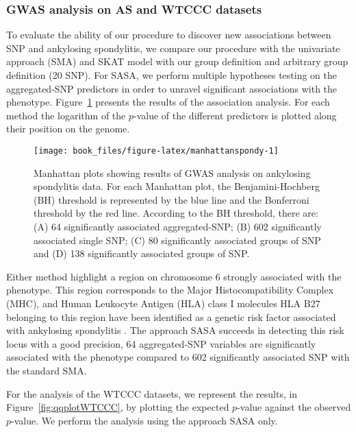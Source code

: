 \documentclass[]{book}
\begin{document}
\hypertarget{gwas-analysis-on-as-and-wtccc-datasets}{%
\subsubsection{GWAS analysis on AS and WTCCC datasets}\label{gwas-analysis-on-as-and-wtccc-datasets}}

To evaluate the ability of our procedure to discover new associations
between SNP and ankylosing spondylitis, we compare our procedure with
the univariate approach (SMA) and SKAT model with our group definition
and arbitrary group definition (20 SNP). For SASA, we perform multiple
hypotheses testing on the aggregated-SNP predictors in order to unravel
significant associations with the phenotype.
Figure~\ref{fig:manhattanspondy} presents the results of the association
analysis. For each method the logarithm of the \(p\)-value of the
different predictors is plotted along their position on the genome.



\begin{figure}

{\centering \texttt{[image: book\_files/figure-latex/manhattanspondy-1]} 

}

\caption{Manhattan plots showing results of GWAS analysis on ankylosing spondylitis data. For each Manhattan plot, the Benjamini-Hochberg (BH) threshold is represented by the blue line and the Bonferroni threshold by the red line. According to the BH threshold, there are: (A) 64 significantly associated aggregated-SNP; (B) 602 significantly associated single SNP; (C) 80 significantly associated groups of SNP and (D) 138 significantly associated groups of SNP.}\label{fig:manhattanspondy}
\end{figure}

Either method highlight a region on chromosome 6 strongly associated
with the phenotype. This region corresponds to the Major
Histocompatibility Complex (MHC), and Human Leukocyte Antigen (HLA)
class I molecules HLA B27 belonging to this region have been identified
as a genetic risk factor associated with ankylosing spondylitis \citep{woodrow_HLA_1978}. The approach SASA succeeds in detecting this risk
locus with a good precision, 64 aggregated-SNP variables are
significantly associated with the phenotype compared to 602
significantly associated SNP with the standard SMA.

For the analysis of the WTCCC datasets, we represent the results, in
Figure~\ref{fig:qqplotWTCCC}, by plotting the expected \(p\)-value against
the observed \(p\)-value. We perform the analysis using the approach SASA
only.
\end{document}
